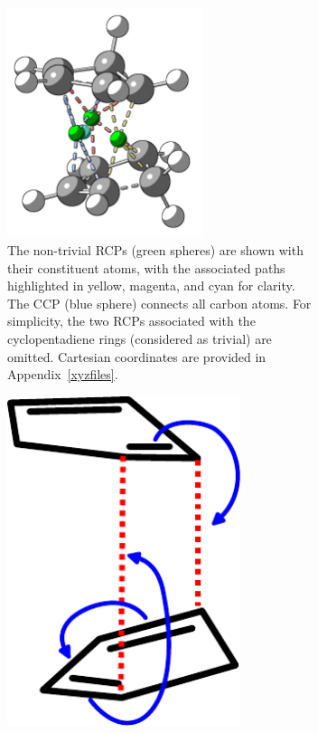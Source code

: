 \vspace*{0.7cm}%
\begin{figure}[h]
  \begin{subfigure}[t]{0.63\textwidth}
    \centering
    \includegraphics[width=0.63\textwidth]{img/dielsAlder.png}
    \caption{The non-trivial \glspl{RCP} (green
      spheres) are shown with their constituent atoms, with the associated paths
      highlighted in yellow, magenta, and cyan for clarity. The \gls{CCP} (blue
      sphere) connects all carbon atoms. For simplicity, the two \glspl{RCP}
      associated with the cyclopentadiene rings (considered as trivial) are omitted.
      Cartesian coordinates are provided in Appendix~\ref{xyzfiles}.}
    \label{diels_alder}
  \end{subfigure}
  \hfill%
  \begin{subfigure}[t]{0.34\textwidth}
    \centering
    \includegraphics[width=0.75\textwidth]{img/da_flechas.pdf}

\end{subfigure}
\end{figure}
